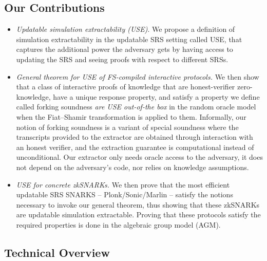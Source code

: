 \subsection{Our Contributions}
\begin{itemize}
\item 
\emph{Updatable simulation extractability (USE)}. 
We propose a definition of simulation extractability in the updatable SRS setting called USE, that captures the additional power the adversary gets by having access to updating the SRS and seeing proofs with respect to different SRSs.
    
\item 
\emph{General theorem for USE of FS-compiled interactive protocols.}
We then show that a class of interactive proofs of knowledge that are honest-verifier zero-knowledge,
have a unique response property, and satisfy a property we define called forking soundness \emph{are USE out-of-the box} in the random oracle model when the Fiat--Shamir transformation is applied to them. 
Informally, our notion of forking soundness is a variant of special soundness where the transcripts provided to the extractor are
obtained through interaction with an honest verifier, and the extraction guarantee is computational instead of unconditional. 
Our extractor only needs oracle access to the adversary, it does not depend on the adversary’s code, nor relies on knowledge
assumptions.
    
\item
\emph{USE for concrete zkSNARKs.}
We then prove that the most efficient updatable SRS SNARKS -- Plonk/Sonic/Marlin -- satisfy the notions necessary to invoke our general theorem, thus showing that these zkSNARKs are updatable simulation extractable.
Proving that these protocols satisfy the required properties is done in the algebraic group model (AGM).
	
\end{itemize}



\subsection{Technical Overview}

